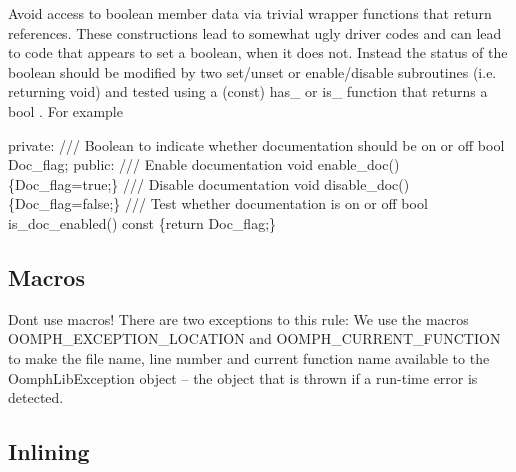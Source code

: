 \begin{DoxyItemize}
\item Avoid access to boolean member data via trivial wrapper functions that return references. These constructions lead to somewhat ugly driver codes and can lead to code that appears to set a boolean, when it does not. Instead the status of the boolean should be modified by two set/unset or enable/disable subroutines (i.\+e. returning void) and tested using a (const) has\+\_\+ or is\+\_\+ function that returns a bool . For example 
\begin{DoxyCode}
\textcolor{keyword}{private}:\textcolor{comment}{}
\textcolor{comment}{  /// Boolean to indicate whether documentation should be on or off}
\textcolor{comment}{}  \textcolor{keywordtype}{bool} Doc\_flag;
\textcolor{keyword}{public}:\textcolor{comment}{}
\textcolor{comment}{  /// Enable documentation}
\textcolor{comment}{}  \textcolor{keywordtype}{void} enable\_doc() \{Doc\_flag=\textcolor{keyword}{true};\}\textcolor{comment}{}
\textcolor{comment}{  /// Disable documentation}
\textcolor{comment}{}  \textcolor{keywordtype}{void} disable\_doc() \{Doc\_flag=\textcolor{keyword}{false};\}\textcolor{comment}{}
\textcolor{comment}{  /// Test whether documentation is on or off}
\textcolor{comment}{}  \textcolor{keywordtype}{bool} is\_doc\_enabled()\textcolor{keyword}{ const }\{\textcolor{keywordflow}{return} Doc\_flag;\}
\end{DoxyCode}

\end{DoxyItemize}\hypertarget{index_dont_use_macros}{}\subsection{Macros}\label{index_dont_use_macros}

\begin{DoxyItemize}
\item Don\textquotesingle{}t use macros! There are two exceptions to this rule\+: We use the macros {\ttfamily O\+O\+M\+P\+H\+\_\+\+E\+X\+C\+E\+P\+T\+I\+O\+N\+\_\+\+L\+O\+C\+A\+T\+I\+ON} and {\ttfamily O\+O\+M\+P\+H\+\_\+\+C\+U\+R\+R\+E\+N\+T\+\_\+\+F\+U\+N\+C\+T\+I\+ON} to make the file name, line number and current function name available to the {\ttfamily Oomph\+Lib\+Exception} object -- the object that is thrown if a run-\/time error is detected.
\end{DoxyItemize}\hypertarget{index_inlining}{}\subsection{Inlining}\label{index_inlining}

